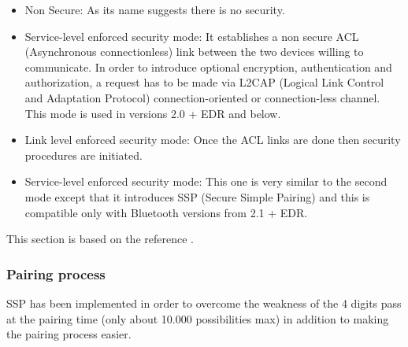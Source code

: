   \begin{itemize}[nolistsep,noitemsep]
  	\item Non Secure: As its name suggests there is no security.
  	\item Service-level enforced security mode: It establishes a non secure ACL (Asynchronous connectionless) link between the two devices willing to communicate. In order to introduce optional encryption, authentication and authorization, a request has to be made via L2CAP (Logical Link Control and Adaptation Protocol) connection-oriented or connection-less channel. This mode is used in versions 2.0 + EDR and below.
  	\item Link level enforced security mode: Once the ACL links are done then security procedures are initiated.
  	\item Service-level enforced security mode: This one is very similar to the second mode except that it introduces SSP (Secure Simple Pairing) and this is compatible only with Bluetooth versions from 2.1 + EDR.\\
  \end{itemize}
  
\noindent This section is based on the reference \cite{btsecoverview}.

\subsubsection{Pairing process}
\label{subsubsec:pairingprocess}

SSP has been implemented in order to overcome the weakness of the 4 digits pass at the pairing time (only about 10.000 possibilities max) in addition to making the pairing process easier. \\

